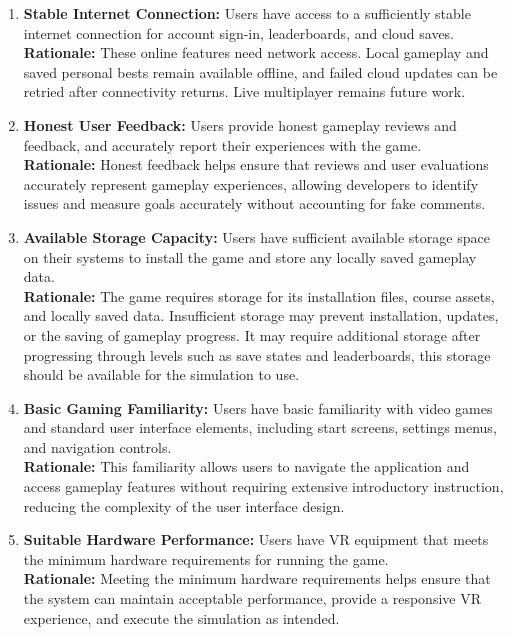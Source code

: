 \documentclass{article}
\begin{document}
\begin{enumerate}
    \item \textbf{Stable Internet Connection:} Users have access to a sufficiently stable internet connection for account sign-in, leaderboards, and cloud saves.\\
    \textbf{Rationale:} These online features need network access. Local gameplay and saved personal bests remain available offline, and failed cloud updates can be retried after connectivity returns. Live multiplayer remains future work.

    \item \textbf{Honest User Feedback:} Users provide honest gameplay reviews and feedback, and accurately report their experiences with the game.\\
    \textbf{Rationale:} Honest feedback helps ensure that reviews and user evaluations accurately represent gameplay experiences, allowing developers to identify issues and measure goals accurately without accounting for fake comments.

    \item \textbf{Available Storage Capacity:} Users have sufficient available storage space on their systems to install the game and store any locally saved gameplay data.\\
    \textbf{Rationale:} The game requires storage for its installation files, course assets, and locally saved data. Insufficient storage may prevent installation, updates, or the saving of gameplay progress. It may require additional storage after progressing through levels such as save states and leaderboards, this storage should be available for the simulation to use.

    \item \textbf{Basic Gaming Familiarity:} Users have basic familiarity with video games and standard user interface elements, including start screens, settings menus, and navigation controls.\\
    \textbf{Rationale:} This familiarity allows users to navigate the application and access gameplay features without requiring extensive introductory instruction, reducing the complexity of the user interface design.

    \item \textbf{Suitable Hardware Performance:} Users have VR equipment that meets the minimum hardware requirements for running the game.\\
    \textbf{Rationale:} Meeting the minimum hardware requirements helps ensure that the system can maintain acceptable performance, provide a responsive VR experience, and execute the simulation as intended.


\end{enumerate}
\end{document}
